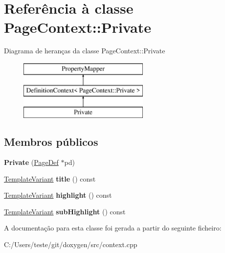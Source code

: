 \hypertarget{class_page_context_1_1_private}{\section{Referência à classe Page\-Context\-:\-:Private}
\label{class_page_context_1_1_private}
}
Diagrama de heranças da classe Page\-Context\-:\-:Private\begin{figure}[H]
\begin{center}
\leavevmode
\includegraphics[height=3.000000cm]{class_page_context_1_1_private}
\end{center}
\end{figure}
\subsection*{Membros públicos}
\begin{DoxyCompactItemize}
\item 
\hypertarget{class_page_context_1_1_private_ac1f774bae72ba41b81946496c407f947}{{\bfseries Private} (\hyperlink{class_page_def}{Page\-Def} $\ast$pd)}\label{class_page_context_1_1_private_ac1f774bae72ba41b81946496c407f947}

\item 
\hypertarget{class_page_context_1_1_private_a5732df72750a31555da8a10f5788ef02}{\hyperlink{class_template_variant}{Template\-Variant} {\bfseries title} () const }\label{class_page_context_1_1_private_a5732df72750a31555da8a10f5788ef02}

\item 
\hypertarget{class_page_context_1_1_private_ab088f4d955499ca1d67c286a117e5bfe}{\hyperlink{class_template_variant}{Template\-Variant} {\bfseries highlight} () const }\label{class_page_context_1_1_private_ab088f4d955499ca1d67c286a117e5bfe}

\item 
\hypertarget{class_page_context_1_1_private_a07fdcdf7a4c2a31c3ca0c5ffea8b6a9e}{\hyperlink{class_template_variant}{Template\-Variant} {\bfseries sub\-Highlight} () const }\label{class_page_context_1_1_private_a07fdcdf7a4c2a31c3ca0c5ffea8b6a9e}

\end{DoxyCompactItemize}


A documentação para esta classe foi gerada a partir do seguinte ficheiro\-:\begin{DoxyCompactItemize}
\item 
C\-:/\-Users/teste/git/doxygen/src/context.\-cpp\end{DoxyCompactItemize}
